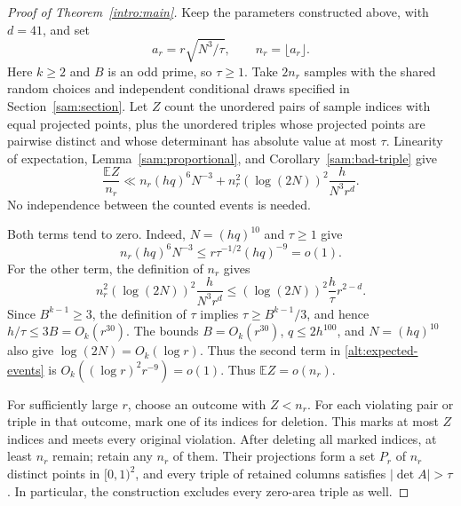 \begin{proof}[Proof of Theorem~\ref{intro:main}]
Keep the parameters constructed above, with $d=41$, and set
\begin{equation}\label{alt:sample-size}
 a_r=r\sqrt{N^3/\tau},\qquad n_r=\lfloor a_r\rfloor.
\end{equation}
Here $k\ge2$ and $B$ is an odd prime, so $\tau\ge1$.  Take $2n_r$ samples
with the shared random choices and independent conditional draws specified
in Section~\ref{sam:section}.  Let $Z$ count the unordered pairs of sample
indices with equal projected points, plus the unordered triples whose
projected points are pairwise distinct and whose determinant has absolute
value at most $\tau$.  Linearity of expectation, Lemma~\ref{sam:proportional},
and Corollary~\ref{sam:bad-triple} give
\begin{equation}\label{alt:expected-events}
 \frac{\mathbb EZ}{n_r}
 \ll n_r(hq)^6N^{-3}
    +n_r^2(\log(2N))^2\frac{h}{N^3r^d}.
\end{equation}
No independence between the counted events is needed.

Both terms tend to zero.  Indeed, $N=(hq)^{10}$ and $\tau\ge1$ give
\[
 n_r(hq)^6N^{-3}\le r\tau^{-1/2}(hq)^{-9}=o(1).
\]
For the other term, the definition of $n_r$ gives
\[
 n_r^2(\log(2N))^2\frac{h}{N^3r^d}
 \le (\log(2N))^2\frac{h}{\tau}r^{2-d}.
\]
Since $B^{k-1}\ge3$, the definition of $\tau$ implies
$\tau\ge B^{k-1}/3$, and hence $h/\tau\le3B=O_k(r^{30})$.
The bounds $B=O_k(r^{30})$, $q\le2h^{100}$, and $N=(hq)^{10}$
also give $\log(2N)=O_k(\log r)$. Thus the second term in
\eqref{alt:expected-events} is
$O_k((\log r)^2r^{-9})=o(1)$.
Thus $\mathbb EZ=o(n_r)$.

For sufficiently large $r$, choose an outcome with $Z<n_r$.  For each
violating pair or triple in that outcome, mark one of its indices for
deletion.  This marks at most $Z$ indices and meets every original
violation.  After deleting all marked indices, at least $n_r$ remain;
retain any $n_r$ of them.  Their projections form a set $P_r$ of $n_r$ distinct
points in $[0,1)^2$, and every triple of retained columns satisfies
$|\det A|>\tau$.  In particular, the construction excludes every
zero-area triple as well.


\end{proof}
